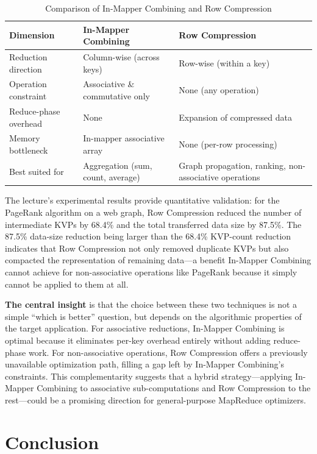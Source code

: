 \documentclass[a4paper,11pt]{article}
\begin{document}
\begin{table}[H]
\centering
\caption{Comparison of In-Mapper Combining and Row Compression}
\label{tab:comparison}
\begin{tabular}{@{}p{3.5cm} p{5cm} p{5cm}@{}}
\toprule
\textbf{Dimension} & \textbf{In-Mapper Combining} & \textbf{Row Compression} \\
\midrule
Reduction direction & Column-wise (across keys) & Row-wise (within a key) \\
Operation constraint & Associative \& commutative only & None (any operation) \\
Reduce-phase overhead & None & Expansion of compressed data \\
Memory bottleneck & In-mapper associative array & None (per-row processing) \\
Best suited for & Aggregation (sum, count, average) & Graph propagation, ranking, non-associative operations \\
\bottomrule
\end{tabular}
\end{table}

The lecture's experimental results provide quantitative validation: for the PageRank algorithm on a web graph, Row Compression reduced the number of intermediate KVPs by 68.4\% and the total transferred data size by 87.5\%. The 87.5\% data-size reduction being larger than the 68.4\% KVP-count reduction indicates that Row Compression not only removed duplicate KVPs but also compacted the representation of remaining data---a benefit In-Mapper Combining cannot achieve for non-associative operations like PageRank because it simply cannot be applied to them at all.

\textbf{The central insight} is that the choice between these two techniques is not a simple ``which is better'' question, but depends on the algorithmic properties of the target application. For associative reductions, In-Mapper Combining is optimal because it eliminates per-key overhead entirely without adding reduce-phase work. For non-associative operations, Row Compression offers a previously unavailable optimization path, filling a gap left by In-Mapper Combining's constraints. This complementarity suggests that a hybrid strategy---applying In-Mapper Combining to associative sub-computations and Row Compression to the rest---could be a promising direction for general-purpose MapReduce optimizers.

\section{Conclusion}
\end{document}
